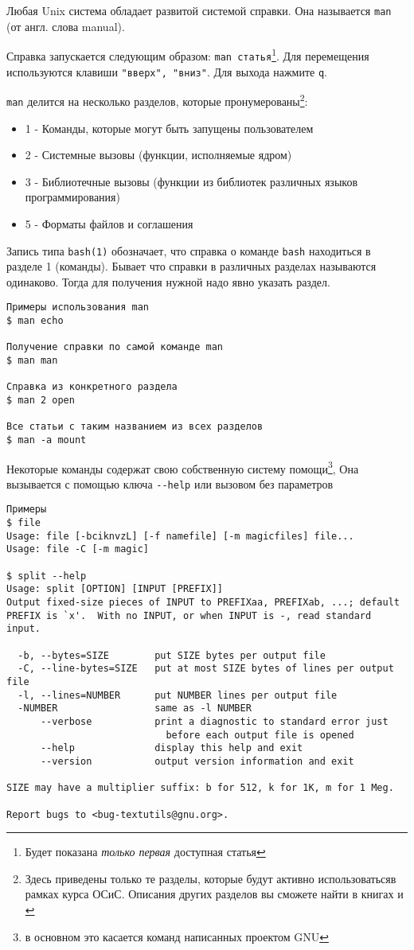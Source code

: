 Любая Unix система обладает развитой системой справки. Она называется \verb+man+ (от англ. слова manual). 

Справка запускается следующим образом: \verb+man статья+\footnote{Будет показана \emph{только первая} доступная статья}. Для перемещения используются клавиши \verb+"вверх", "вниз"+. Для выхода нажмите \verb+q+.

\verb+man+ делится на несколько разделов, которые пронумерованы\footnote{Здесь приведены только те разделы, которые будут активно использоватьсяв рамках курса ОСиС. Описания других разделов вы сможете найти в книгах \cite{Rob} и \cite{Pet}}:
\begin{itemize}
\item 1 -  Команды,  которые  могут  быть   запущены пользователем
\item 2 -  Системные вызовы (функции, исполняемые ядром)
\item 3 -  Библиотечные вызовы (функции из библиотек различных языков программирования)
\item 5 -  Форматы файлов и соглашения
\end{itemize}

Запись типа \verb+bash(1)+ обозначает, что справка о команде \verb+bash+ находиться в разделе 1 (команды). Бывает что справки в различных разделах называются одинаково. Тогда для получения нужной надо явно указать раздел.

\begin{verbatim}
Примеры использования man
$ man echo
 
Получение справки по самой команде man
$ man man

Справка из конкретного раздела
$ man 2 open

Все статьи с таким названием из всех разделов
$ man -a mount
\end{verbatim}

Некоторые команды содержат свою собственную систему помощи\footnote{в основном это касается команд написанных проектом GNU}, Она вызывается с помощью ключа \verb+--help+ или вызовом без параметров
\begin{verbatim}
Примеры
$ file
Usage: file [-bciknvzL] [-f namefile] [-m magicfiles] file...
Usage: file -C [-m magic]

$ split --help
Usage: split [OPTION] [INPUT [PREFIX]]
Output fixed-size pieces of INPUT to PREFIXaa, PREFIXab, ...; default
PREFIX is `x'.  With no INPUT, or when INPUT is -, read standard input.

  -b, --bytes=SIZE        put SIZE bytes per output file
  -C, --line-bytes=SIZE   put at most SIZE bytes of lines per output file
  -l, --lines=NUMBER      put NUMBER lines per output file
  -NUMBER                 same as -l NUMBER
      --verbose           print a diagnostic to standard error just
                            before each output file is opened
      --help              display this help and exit
      --version           output version information and exit

SIZE may have a multiplier suffix: b for 512, k for 1K, m for 1 Meg.

Report bugs to <bug-textutils@gnu.org>.

\end{verbatim}


